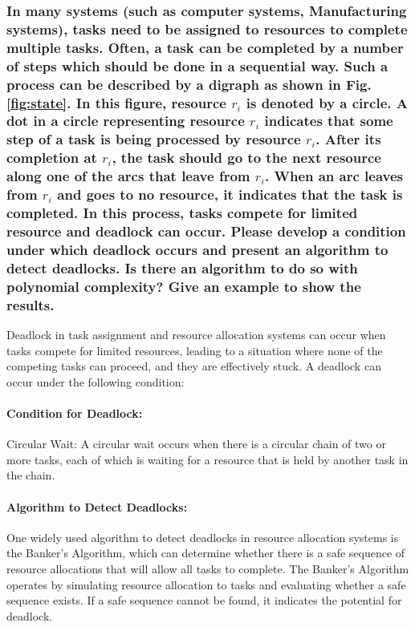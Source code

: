 \documentclass{article}
\begin{document}
\subsubsection{In many systems (such as computer systems, Manufacturing systems), tasks need to be assigned to resources to complete multiple tasks. Often, a task can be completed by a number of steps which should be done in a sequential way. Such a process can be described by a digraph as shown in Fig. \ref{fig:state}. In this figure, resource $r_i$ is denoted by a circle. A dot in a circle representing resource $r_i$ indicates that some step of a task is being processed by resource $r_i$. After its completion at $r_i$, the task should go to the next resource along one of the arcs that leave from $r_i$. When an arc leaves from $r_i$ and goes to no resource, it indicates that the task is completed. In this process, tasks compete for limited resource and deadlock can occur. Please develop a condition under which deadlock occurs and present an algorithm to detect deadlocks. Is there an algorithm to do so with polynomial complexity? Give an example to show the results.}

Deadlock in task assignment and resource allocation systems can occur when tasks compete for limited resources, leading to a situation where none of the competing tasks can proceed, and they are effectively stuck. A deadlock can occur under the following condition:

\paragraph{Condition for Deadlock:}

Circular Wait: A circular wait occurs when there is a circular chain of two or more tasks, each of which is waiting for a resource that is held by another task in the chain.

\paragraph{Algorithm to Detect Deadlocks:}
One widely used algorithm to detect deadlocks in resource allocation systems is the Banker's Algorithm, which can determine whether there is a safe sequence of resource allocations that will allow all tasks to complete. The Banker's Algorithm operates by simulating resource allocation to tasks and evaluating whether a safe sequence exists. If a safe sequence cannot be found, it indicates the potential for deadlock.
\end{document}
